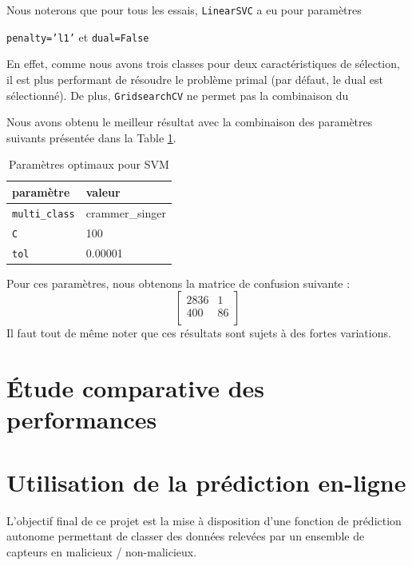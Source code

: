 \documentclass[a4paper]{report}
\begin{document}
\noindent Nous noterons que pour tous les essais, \texttt{LinearSVC} a eu pour paramètres \begin{center}
\texttt{penalty='l1'} et \texttt{dual=False}
\end{center}
En effet, comme nous avons trois classes pour deux caractéristiques de sélection, il est plus performant de résoudre le problème primal (par défaut, le dual est sélectionné). De plus, \texttt{GridsearchCV} ne permet pas la combinaison du %

Nous avons obtenu le meilleur résultat avec la combinaison des paramètres suivants présentée dans la Table \ref{best_params_svm}.
\begin{table}
\centering
\begin{tabular}{ll}
paramètre & valeur \\
\hline
\texttt{multi\_class} & crammer\_singer \\
\texttt{C} & 100 \\
\texttt{tol} & 0.00001\\
\end{tabular}
\caption{Paramètres optimaux pour SVM\label{best_params_svm}}
\end{table}
Pour ces paramètres, nous obtenons la matrice de confusion suivante :
$$\begin{bmatrix}
2836 & 1 \\ 
400 & 86 \\
\end{bmatrix}$$
Il faut tout de même noter que ces résultats sont sujets à des fortes variations.

\section{Étude comparative des performances}

\section{Utilisation de la prédiction en-ligne}

L'objectif final de ce projet est la mise à disposition d'une fonction de prédiction autonome permettant de classer des données relevées par un ensemble de capteurs en malicieux / non-malicieux.
\end{document}
